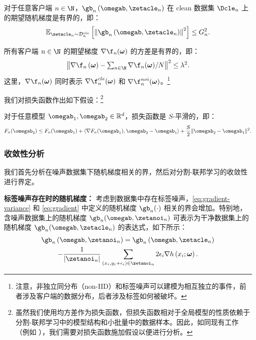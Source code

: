 \begin{assumption}[均方误差下的随机梯度]\label{ass:gradient}
对于任意客户端 $n\in\N$，$\gb_n\left(\omegab,\zetacle_n\right)$ 在 clean 数据集 $\Dcle_n$ 上的期望随机梯度是有界的，即：
\begin{equation}\label{eq:gradient}
\mathbb{E}_{\zetacle_n\sim \mathcal{D}_n^{cle}}\left[\left\Vert \gb_n\left(\omegab, \zetacle_n\right) \right\Vert^2\right] \leq G_n^2.
\end{equation}
\end{assumption}

\begin{assumption}[数据异构性]\label{ass:heter}
所有客户端 $n\in\N$ 的期望梯度 $\nabla \f_n(\boldsymbol{\omega})$ 的方差是有界的，即：
\begin{equation}
\textstyle \left\Vert 
\nabla \f_n\left(\boldsymbol{\omega}\right)- \sum_{n\in\N}
\nabla\f_n(\boldsymbol{\omega})/N \right\Vert^2 \le \lambda^2.
\end{equation}
这里，$\nabla \f_n(\boldsymbol{\omega})$ 同时表示 $\nabla \f_n^{cle}(\boldsymbol{\omega})$ 和 $\nabla \f_n^{noi}(\boldsymbol{\omega})$。\footnote{注意，非独立同分布（non-IID）和标签噪声可以建模为相互独立的事件，前者涉及客户端的数据分布，后者涉及标签如何被破坏。}

\end{assumption}

我们对损失函数作出如下假设：\footnote{虽然我们使用均方差作为损失函数，但损失函数相对于全局模型的性质依赖于分割-联邦学习中的模型结构和小批量中的数据样本。因此，如同现有工作（例如 \cite{b4,b11,b8}），我们需要对损失函数施加假设以便进行分析。}

\begin{assumption}[$S$-平滑性]\label{ass:smooth}
对于任意模型 $\omegab_1, \omegab_2\in \mathbb{R}^d$，损失函数是 $S$-平滑的，即：
$$
F_n(\omegab_2) \leq F_n(\omegab_1)+\langle \nabla F_n(\omegab_1), \omegab_2-\omegab_1\rangle +\frac{S}{2}\|\omegab_2-\omegab_1\|^2.
$$
\end{assumption}

\subsubsection{收敛性分析}\label{proofC}
我们首先分析在噪声数据集下随机梯度相关的界，然后对分割-联邦学习的收敛性进行界定。

\textbf{标签噪声存在时的随机梯度：} 考虑到数据集中存在标签噪声，\eqref{eq:gradient-variance} 和 \eqref{eq:gradient} 中定义的随机梯度 $\gb_n(\cdot)$ 相关的界会增加。特别地，含噪声数据集上的随机梯度 $\gb_n(\omegab,\zetanoi_n)$ 可表示为干净数据集上的随机梯度 $\gb_n(\omegab,\zetacle_n)$ 的表达式，如下所示：
\begin{multline}\label{Gradient of clean loss}
\gb_n\left(\omegab,\zetanoi_n\right) %
=\gb_n\left(\omegab,\zetacle_n\right)\\
-\frac{1}{|\zetanoi_n|}\sum_{\left(x_i,y_i+\epsilon_i\right)\in \zetanoi_n}2\epsilon_i \nabla h\left(x_i;\boldsymbol{\omega}\right).
\end{multline}

